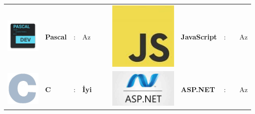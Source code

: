 \documentclass[paper=a4,fontsize=11pt]{temp} %
\begin{document}
\begin{minipage}[t]{0.66\textwidth}
\begin{tabular}{lllllllllll}
\includegraphics[scale=0.02]{IMG/languages/pascal} & \textbf{Pascal}   & : & Az  &  &  & \includegraphics[scale=0.075]{IMG/languages/javascript} & \textbf{JavaScript} & : &  & Az  \\
\includegraphics[scale=0.05]{IMG/languages/c} & \textbf{C}        & : & \textbf{İyi} &  &  & \includegraphics[scale=0.015]{IMG/languages/aspnet} & \textbf{ASP.NET}    & : &  & Az  \\

\end{tabular}
\end{minipage}
\end{document}

